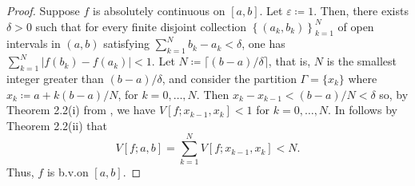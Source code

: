 \begin{proof}
Suppose $f$ is absolutely continuous on $[a,b]$. Let $\varepsilon\coloneqq
1$. Then, there exists $\delta>0$ such that for every finite disjoint
collection $\left\{(a_k,b_k)\right\}_{k=1}^N$ of open intervals in $(a,b)$
satisfying $\sum_{k=1}^Nb_k-a_k<\delta$, one has
$\sum_{k=1}^N\left|f(b_k)-f(a_k)\right|<1$. Let
$N\coloneqq\lceil(b-a)/\delta\rceil$, that is, $N$ is the smallest integer
greater than $(b-a)/\delta$, and consider the partition $\Gamma=\{x_k\}$
where $x_k\coloneqq a+k(b-a)/N$, for $k=0,\dotsc,N$. Then
$x_k-x_{k-1}<(b-a)/N<\delta$ so, by Theorem 2.2(i) from \cite[Ch.\@ 2, p.\@
19]{wheeden-zygmund}, we have $V[f;x_{k-1},x_k]<1$ for $k=0,\dotsc,N$. In
follows by Theorem 2.2(ii) that
\begin{equation}
\label{eq:prep:1:14}
V[f;a,b]=\sum_{k=1}^N V[f;x_{k-1},x_k]<N.
\end{equation}
Thus, $f$ is b.v.\@ on $[a,b]$.
\end{proof}

